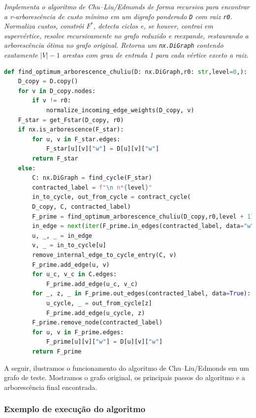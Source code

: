 \begin{tcolorbox}[
        enhanced, breakable,
        colframe=blue!60!black, colback=blue!2,
        colbacktitle=blue!15, coltitle=black,
        title={Procedimento principal (recursivo)},
        boxed title style={sharp corners, boxrule=0.6pt},
        sharp corners, boxrule=0.6pt
    ]
    \emph{Implementa o algoritmo de Chu–Liu/Edmonds de forma recursiva para encontrar a r-arborescência de custo mínimo em um digrafo ponderado \texttt{D} com raiz \texttt{r0}. Normaliza custos, constrói $F^*$, detecta ciclos e, se houver, contrai em supervértice, resolve recursivamente no grafo reduzido e reexpande, restaurando a arborescência ótima no grafo original. Retorna um \texttt{nx.DiGraph} contendo exatamente $|V|-1$ arestas com grau de entrada 1 para cada vértice exceto a raiz.}
    \tcblower
    \begin{lstlisting}[mathescape=true, language=Python]
def find_optimum_arborescence_chuliu(D: nx.DiGraph,r0: str,level=0,):
    D_copy = D.copy()
    for v in D_copy.nodes:
        if v != r0:
            normalize_incoming_edge_weights(D_copy, v)
    F_star = get_Fstar(D_copy, r0)
    if nx.is_arborescence(F_star):
        for u, v in F_star.edges:
            F_star[u][v]["w"] = D[u][v]["w"]
        return F_star
    else:
        C: nx.DiGraph = find_cycle(F_star)   
        contracted_label = f"\n n*{level}"
        in_to_cycle, out_from_cycle = contract_cycle(
        D_copy, C, contracted_label)
        F_prime = find_optimum_arborescence_chuliu(D_copy,r0,level + 1)
        in_edge = next(iter(F_prime.in_edges(contracted_label, data="w")), None)
        u, _, _ = in_edge
        v, _ = in_to_cycle[u]
        remove_internal_edge_to_cycle_entry(C, v)
        F_prime.add_edge(u, v)
        for u_c, v_c in C.edges:
            F_prime.add_edge(u_c, v_c)
        for _, z, _ in F_prime.out_edges(contracted_label, data=True):
            u_cycle, _ = out_from_cycle[z]
            F_prime.add_edge(u_cycle, z)
        F_prime.remove_node(contracted_label)
        for u, v in F_prime.edges:
            F_prime[u][v]["w"] = D[u][v]["w"]
        return F_prime 
\end{lstlisting}
\end{tcolorbox}

A seguir, ilustramos o funcionamento do algoritmo de Chu–Liu/Edmonds em um grafo de teste. Mostramos o grafo original, os principais passos do algoritmo e a arborescência final encontrada.

\subsubsection{Exemplo de execução do algoritmo}

